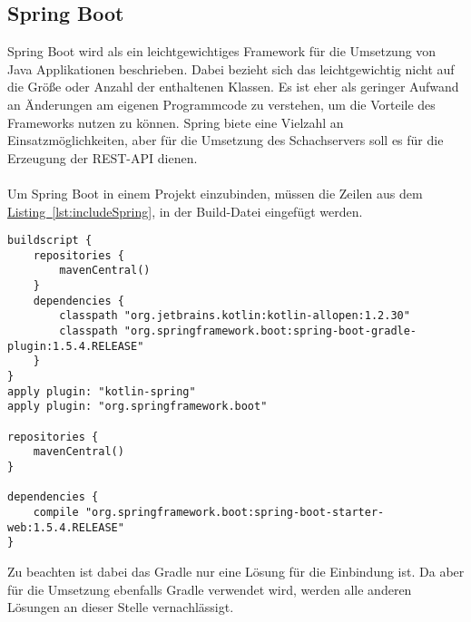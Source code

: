 \subsection{Spring Boot}\label{sec:bibspring}
Spring Boot wird als ein leichtgewichtiges Framework für die Umsetzung von Java Applikationen beschrieben. Dabei bezieht sich das leichtgewichtig nicht auf die Größe oder Anzahl der enthaltenen Klassen. Es ist eher als geringer Aufwand an Änderungen am eigenen Programmcode zu verstehen, um die Vorteile des Frameworks nutzen zu können. \cite{proSpring5} Spring biete eine Vielzahl an Einsatzmöglichkeiten, aber für die Umsetzung des Schachservers soll es für die Erzeugung der \gls{REST}-\gls{API} dienen.\\
\\
Um Spring Boot in einem Projekt einzubinden, müssen die Zeilen aus dem \hyperref[lst:includeSpring]{Listing~\ref{lst:includeSpring}}, in der Build-Datei  eingefügt werden.
\begin{lstlisting}[style=lstStyleFramed, language=Gradle, caption={Einbindung des Spring Framework mittels Gradle}, label=lst:includeSpring, float]
buildscript {
	repositories {
		mavenCentral()
	}
	dependencies {
		classpath "org.jetbrains.kotlin:kotlin-allopen:1.2.30"
		classpath "org.springframework.boot:spring-boot-gradle-plugin:1.5.4.RELEASE"
	}
}
apply plugin: "kotlin-spring"
apply plugin: "org.springframework.boot"

repositories {
	mavenCentral()
}

dependencies {
	compile "org.springframework.boot:spring-boot-starter-web:1.5.4.RELEASE"
}
\end{lstlisting}
Zu beachten ist dabei das Gradle nur eine Lösung für die Einbindung ist. Da aber für die Umsetzung ebenfalls Gradle verwendet wird, werden alle anderen Lösungen an dieser Stelle vernachlässigt.\\
\\ 
